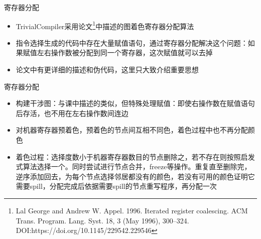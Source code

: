 \documentclass{beamer}
\begin{document}
\begin{frame}{寄存器分配}
\begin{itemize}
  \item TrivialCompiler采用论文\footnote[1]{Lal George and Andrew W. Appel. 1996. Iterated register coalescing. ACM Trans. Program. Lang. Syst. 18, 3 (May 1996), 300–324. DOI:https://doi.org/10.1145/229542.229546}中描述的图着色寄存器分配算法
  \item 指令选择生成的代码中存在大量赋值语句，通过寄存器分配解决这个问题：如果赋值左右操作数被分配到同一个寄存器，这次赋值就可以去掉
  \item 论文中有更详细的描述和伪代码，这里只大致介绍重要思想
\end{itemize}
\end{frame}

\begin{frame}{寄存器分配}
\begin{minipage}{0.75\linewidth}
  \begin{itemize}
    \item 构建干涉图：与课中描述的类似，但特殊处理赋值：即使右操作数在赋值语句后存活，也不用在左右操作数间连边
    \item 对机器寄存器预着色，预着色的节点间互相不同色，着色过程中也不再分配颜色
    \item 着色过程：选择度数小于机器寄存器数目的节点删除之，若不存在则按照启发式算法选择一个。同时尝试进行节点合并，freeze等操作。重复直至删除完，逆序添加回去，为每个节点选择邻居都没有的颜色，若没有可用的颜色证明它需要spill，分配完成后依据需要spill的节点重写程序，再分配一次
  \end{itemize}
\end{minipage}
\begin{minipage}{0.2\linewidth}
  \begin{figure}[htpb]
    \centering

\end{figure}
\end{minipage}
\end{frame}
\end{document}
